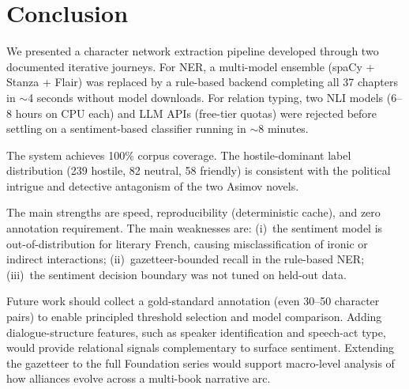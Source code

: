 \documentclass[a4paper]{article}
\begin{document}
\section{Conclusion}

We presented a character network extraction pipeline developed through
two documented iterative journeys. For NER, a multi-model ensemble
(spaCy + Stanza + Flair) was replaced by a rule-based backend completing
all 37 chapters in $\sim$4 seconds without model downloads. For relation
typing, two NLI models (6--8 hours on CPU each) and LLM APIs
(free-tier quotas) were rejected before settling on a sentiment-based
classifier running in $\sim$8 minutes.

The system achieves 100\% corpus coverage. The hostile-dominant label
distribution (239 hostile, 82 neutral, 58 friendly) is consistent with
the political intrigue and detective antagonism of the two Asimov novels.

The main strengths are speed, reproducibility (deterministic cache),
and zero annotation requirement. The main weaknesses are:
(i)~the sentiment model is out-of-distribution for literary French,
causing misclassification of ironic or indirect interactions;
(ii)~gazetteer-bounded recall in the rule-based NER;
(iii)~the sentiment decision boundary was not tuned on held-out data.

Future work should collect a gold-standard annotation (even 30--50
character pairs) to enable principled threshold selection and model
comparison. Adding dialogue-structure features, such as speaker identification
and speech-act type, would provide relational signals complementary to
surface sentiment. Extending the gazetteer to the full Foundation series
would support macro-level analysis of how alliances evolve across a
multi-book narrative arc.


\end{document}
